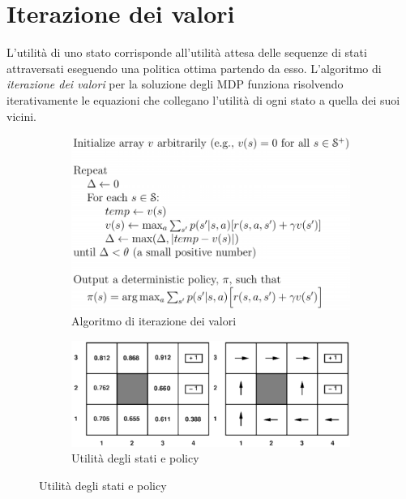 \documentclass[11pt,oneside]{book}
\begin{document}
\section{Iterazione dei valori}
L'utilità di uno stato corrisponde all'utilità attesa delle sequenze di stati attraversati eseguendo una politica ottima partendo da esso. L'algoritmo di \textit{iterazione dei valori} per la soluzione degli MDP funziona risolvendo iterativamente le equazioni che collegano l'utilità di ogni stato a quella dei suoi vicini.
\begin{figure}[htp]
	\begin{subfigure}{0.49\textwidth}
	    \centering
		\includegraphics[width=\textwidth, height=\textheight, keepaspectratio]{value-iteration1.png}
		\caption{Algoritmo di iterazione dei valori}
	\end{subfigure}
	\hfill
	\begin{subfigure}{0.49\textwidth}
	    \centering
		\includegraphics[width=\textwidth, height=\textheight, keepaspectratio]{value-iteration2.png}
		\caption{Utilità degli stati e policy}
	\end{subfigure}
\end{figure}
\end{document}
